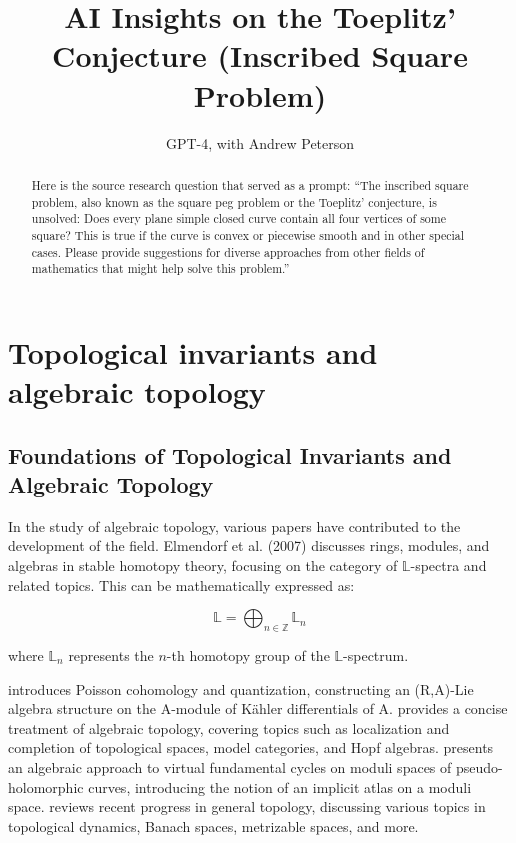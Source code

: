\documentclass{article}
\title{AI Insights on the Toeplitz' Conjecture (Inscribed Square Problem)
}
\date{}
\author{\hspace{1mm}GPT-4, with Andrew Peterson}%
\begin{document}
\maketitle

\begin{abstract}
Here is the source research question that served as a prompt: ``The inscribed square problem, also known as the square peg problem or the Toeplitz' conjecture, is unsolved: Does every plane simple closed curve contain all four vertices of some square? This is true if the curve is convex or piecewise smooth and in other special cases. Please provide suggestions for diverse approaches from other fields of mathematics that might help solve this problem.''
\end{abstract}

\section{Topological invariants and algebraic topology}

\subsection{Foundations of Topological Invariants and Algebraic Topology}

In the study of algebraic topology, various papers have contributed to the development of the field. Elmendorf et al. (2007) discusses rings, modules, and algebras in stable homotopy theory, focusing on the category of $\mathbb{L}$-spectra and related topics. This can be mathematically expressed as:

\[
\mathbb{L} = \bigoplus_{n \in \mathbb{Z}} \mathbb{L}_n
\]

where $\mathbb{L}_n$ represents the $n$-th homotopy group of the $\mathbb{L}$-spectrum.

\cite{Huebschmann2013PoissonCA} introduces Poisson cohomology and quantization, constructing an (R,A)-Lie algebra structure on the A-module of Kähler differentials of A. \cite{May2012MoreCA} provides a concise treatment of algebraic topology, covering topics such as localization and completion of topological spaces, model categories, and Hopf algebras. \cite{Pardon2013AnAA} presents an algebraic approach to virtual fundamental cycles on moduli spaces of pseudo-holomorphic curves, introducing the notion of an implicit atlas on a moduli space. \cite{Husek2002RecentPI} reviews recent progress in general topology, discussing various topics in topological dynamics, Banach spaces, metrizable spaces, and more.
\end{document}
